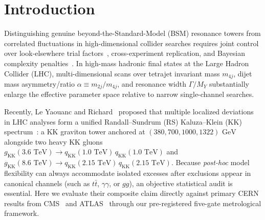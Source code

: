 \documentclass[11pt,a4paper]{article}
\begin{document}
\section{Introduction}
Distinguishing genuine beyond-the-Standard-Model (BSM) resonance towers from correlated fluctuations in high-dimensional collider searches requires joint control over look-elsewhere trial factors~\cite{gross2010}, cross-experiment replication, and Bayesian complexity penalties~\cite{olivaes2026lhc,olivaes2026nsbi,olivaes2026book}. In high-mass hadronic final states at the Large Hadron Collider (LHC), multi-dimensional scans over tetrajet invariant mass $m_{4j}$, dijet mass asymmetry/ratio $\alpha \equiv m_{2j}/m_{4j}$, and resonance width $\Gamma/M_Y$ substantially enlarge the effective parameter space relative to narrow single-channel searches.

Recently, Le Yaouanc and Richard~\cite{leyaouanc2026gluon,leyaouanc2026graviton} proposed that multiple localized deviations in LHC analyses form a unified Randall--Sundrum (RS) Kaluza--Klein (KK) spectrum~\cite{randall1999}: a KK graviton tower anchored at $(380, 700, 1000, 1322)\text{ GeV}$ alongside two heavy KK gluons $g_{\mathrm{KK}}(3.6\text{ TeV}) \to q_{\mathrm{KK}}(1.0\text{ TeV})\,q_{\mathrm{KK}}(1.0\text{ TeV})$ and $g_{\mathrm{KK}}(8.6\text{ TeV}) \to q_{\mathrm{KK}}(2.15\text{ TeV})\,q_{\mathrm{KK}}(2.15\text{ TeV})$. Because \emph{post-hoc} model flexibility can always accommodate isolated excesses after exclusions appear in canonical channels (such as $t\bar{t}$, $\gamma\gamma$, or $gg$), an objective statistical audit is essential. Here we evaluate their composite claim directly against primary CERN results from CMS~\cite{cms2023dijet,cms_run3_exo25004} and ATLAS~\cite{atlas2023dijet} through our pre-registered five-gate metrological framework.
\end{document}
